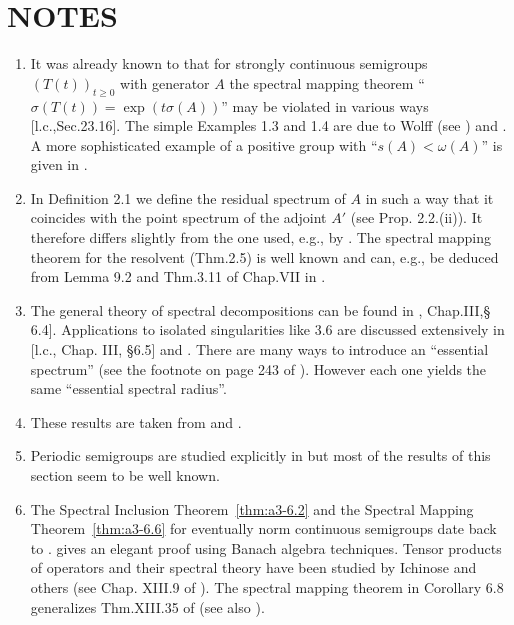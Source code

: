 \section*{NOTES}
\begin{enumerate}[label=\emph{Section \arabic*:}, wide]
\item 
It was already known to \citet{hillephillips:1957} that for strongly continuous semigroups $(T(t))_{t\geq 0}$ with generator $A$ the spectral mapping theorem \enquote{$\sigma(T(t)) = \exp(t\sigma(A))$} may be violated in various ways [l.c.,Sec.23.16].
The simple Examples 1.3 and 1.4 are due to Wolff (see \citet{greinervoigtwolff:1981}) and \citet{zabczyk:1975}.
A more sophisticated example of a positive group with 
\enquote{$s(A) < \omega(A)$} is given in \citet{wolff:1981}.

\item 
In Definition 2.1 we define the residual spectrum of $A$ in such a way that it coincides with the point spectrum of the adjoint $A'$ (see Prop. 2.2.(ii)).
It therefore differs slightly from the one used, e.g., by \citet{schaefer:1974}.
The spectral mapping theorem for the resolvent (Thm.2.5) is well known and can, e.g., be deduced from Lemma 9.2 and Thm.3.11 of Chap.VII in \citet{dunfordschwartz:1958}.

\item 
The general theory of spectral decompositions can be found in \citet{kato:1966}, Chap.III,§ 6.4].
Applications to isolated singularities like 3.6 are discussed extensively in [l.c., Chap. III, §6.5] and \citet[Chap.VIII, Sec.8]{yosida:1965}.
There are many ways to introduce an \enquote{essential spectrum} (see the footnote on page 243 of \citet{kato:1966}).
However each one yields the same \enquote{essential spectral radius}.

\item 
These results are taken from \citet{derndinger:1980} and \citet{greiner:1981}.

\item 
Periodic semigroups are studied explicitly in \citet{bart:1977} but most of the results of this section seem to be well known.

\item
The Spectral Inclusion Theorem~\ref{thm:a3-6.2} and the Spectral Mapping Theorem~\ref{thm:a3-6.6} for eventually norm continuous semigroups date back to \citet{hillephillips:1957}.
\citet{davies:1980} gives an elegant proof using Banach algebra techniques.
Tensor products of operators and their spectral theory have been studied by Ichinose and others (see Chap. XIII.9 of \citet{reedsimon:1978}).
The spectral mapping theorem in Corollary 6.8 generalizes Thm.XIII.35 of \citet{reedsimon:1978} (see also \citet{herbst:1982}).


\end{enumerate}
